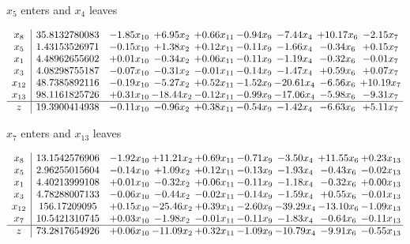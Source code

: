 \documentclass[8pt]{article}
\begin{document}
 $ x_{5} $ enters and $ x_{4} $ leaves 

 \[\begin{array}{c| c c@{\hskip 2pt} c@{\hskip 2pt} c@{\hskip 2pt} c@{\hskip 2pt} c@{\hskip 2pt} c@{\hskip 2pt} c@{\hskip 2pt} }
 x_{8}   &  35.8132780083 & -1.85 x_{10} & +  6.95 x_{2} & +  0.66 x_{11} & -0.94 x_{9} & -7.44 x_{4} & + 10.17 x_{6} & -2.15 x_{7}\\
 x_{5}   &  1.43153526971 & -0.15 x_{10} & +  1.38 x_{2} & +  0.12 x_{11} & -0.11 x_{9} & -1.66 x_{4} & -0.34 x_{6} & +  0.15 x_{7}\\
 x_{1}   &  4.48962655602 & +  0.01 x_{10} & -0.34 x_{2} & +  0.06 x_{11} & -0.11 x_{9} & -1.19 x_{4} & -0.32 x_{6} & -0.01 x_{7}\\
 x_{3}   &  4.08298755187 & -0.07 x_{10} & -0.31 x_{2} & -0.01 x_{11} & -0.14 x_{9} & -1.47 x_{4} & +  0.59 x_{6} & +  0.07 x_{7}\\
 x_{12}   &  48.7385892116 & -0.19 x_{10} & -5.27 x_{2} & +  0.52 x_{11} & -1.52 x_{9} & -20.61 x_{4} & -6.56 x_{6} & + 10.19 x_{7}\\
 x_{13}   &  98.1161825726 & +  0.31 x_{10} & -18.44 x_{2} & -0.12 x_{11} & -0.99 x_{9} & -17.06 x_{4} & -5.98 x_{6} & -9.31 x_{7}\\
\hline
z    &  19.3900414938 & -0.11 x_{10} & -0.96 x_{2} & +  0.38 x_{11} & -0.54 x_{9} & -1.42 x_{4} & -6.63 x_{6} & +  5.11 x_{7}\\
\end{array}\]


 $ x_{7} $ enters and $ x_{13} $ leaves 

 \[\begin{array}{c| c c@{\hskip 2pt} c@{\hskip 2pt} c@{\hskip 2pt} c@{\hskip 2pt} c@{\hskip 2pt} c@{\hskip 2pt} c@{\hskip 2pt} }
 x_{8}   &  13.1542576906 & -1.92 x_{10} & + 11.21 x_{2} & +  0.69 x_{11} & -0.71 x_{9} & -3.50 x_{4} & + 11.55 x_{6} & +  0.23 x_{13}\\
 x_{5}   &  2.96255015604 & -0.14 x_{10} & +  1.09 x_{2} & +  0.12 x_{11} & -0.13 x_{9} & -1.93 x_{4} & -0.43 x_{6} & -0.02 x_{13}\\
 x_{1}   &  4.40213999108 & +  0.01 x_{10} & -0.32 x_{2} & +  0.06 x_{11} & -0.11 x_{9} & -1.18 x_{4} & -0.32 x_{6} & +  0.00 x_{13}\\
 x_{3}   &  4.78288007133 & -0.06 x_{10} & -0.44 x_{2} & -0.02 x_{11} & -0.14 x_{9} & -1.59 x_{4} & +  0.55 x_{6} & -0.01 x_{13}\\
 x_{12}   &  156.17209095 & +  0.15 x_{10} & -25.46 x_{2} & +  0.39 x_{11} & -2.60 x_{9} & -39.29 x_{4} & -13.10 x_{6} & -1.09 x_{13}\\
 x_{7}   &  10.5421310745 & +  0.03 x_{10} & -1.98 x_{2} & -0.01 x_{11} & -0.11 x_{9} & -1.83 x_{4} & -0.64 x_{6} & -0.11 x_{13}\\
\hline
z    &  73.2817654926 & +  0.06 x_{10} & -11.09 x_{2} & +  0.32 x_{11} & -1.09 x_{9} & -10.79 x_{4} & -9.91 x_{6} & -0.55 x_{13}\\
\end{array}\]
\end{document}
